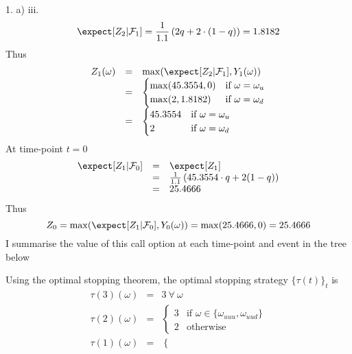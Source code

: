 \documentclass[11pt,a4paper]{article}
\begin{document}
\begin{answer}{1. a) iii.}
  \[ \expect[Z_2|\mathcal{F}_1]=\frac1{1.1}\left(2q+2\cdot(1-q)\right)=1.8182 \]
  Thus
  \[\begin{array}{rcl}
    Z_1(\omega)&=&\max(\expect[Z_2|\mathcal{F}_1],Y_1(\omega))\\
    &=&\begin{cases}
      \max(45.3554,0)&\text{if }\omega=\omega_u\\
      \max(2,1.8182)&\text{if }\omega=\omega_d
    \end{cases}\\
    &=&\begin{cases}
      45.3554&\text{if }\omega=\omega_u\\
      2&\text{if }\omega=\omega_d
    \end{cases}
  \end{array}\]
  At time-point $t=0$
  \[\begin{array}{rcl}
    \expect[Z_1|\mathcal{F}_0]&=&\expect[Z_1]\\
    &=&\frac1{1.1}\left(45.3554\cdot q+2(1-q)\right)\\
    &=&25.4666
  \end{array}\]
  Thus
  \[ Z_0=\max(\expect[Z_1|\mathcal{F}_0],Y_0(\omega))=\max(25.4666,0)=25.4666 \]
  I summarise the value of this call option at each time-point and event in the tree below
  \begin{center}
  \end{center}
  Using the optimal stopping theorem, the optimal stopping strategy $\{\tau(t)\}_t$ is
  \[\begin{array}{rcl}
    \tau(3)(\omega)&=&3\ \forall\ \omega\\
    \tau(2)(\omega)&=&\begin{cases}
      3&\text{if }\omega\in\{\omega_{uuu},\omega_{uud}\}\\
      2&\text{otherwise}
    \end{cases}\\
    \tau(1)(\omega)&=&\begin{cases}

\end{cases}
\end{array}\]
\end{answer}
\end{document}
